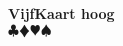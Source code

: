\documentclass[12pt,a4paper]{report}
\begin{document}
	\begin{center}	
		\begin{huge}
			\textbf{VijfKaart hoog} \\
			$\clubsuit \vardiamondsuit \varheartsuit \spadesuit$  \\
		\end{huge}
	\end{center}
	\ \\ \\ \\ \\ \\ \\ \\ \\ \\ \\ \\ \\ \\ \\ \\ \\ \\ \\ \\ \\ \\ \\ \\ \\
	\\ \\ \\ \\ \\ \\ \\ \\ \\ \\

\end{document}
